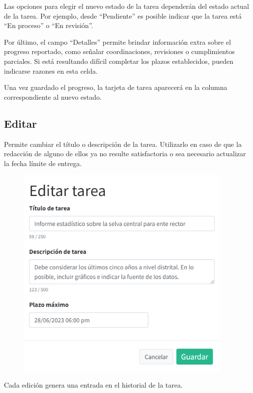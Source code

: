 \documentclass[
  letterpaper,
  DIV=11,
  numbers=noendperiod]{scrreprt}
\begin{document}
Las opciones para elegir el nuevo estado de la tarea dependerán del
estado actual de la tarea. Por ejemplo, desde ``Pendiente'' es posible
indicar que la tarea está ``En proceso'' o ``En revisión''.

Por último, el campo ``Detalles'' permite brindar información extra
sobre el progreso reportado, como señalar coordinaciones, revisiones o
cumplimientos parciales. Si está resultando difícil completar los plazos
establecidos, pueden indicarse razones en esta celda.

Una vez guardado el progreso, la tarjeta de tarea aparecerá en la
columna correspondiente al nuevo estado.

\hypertarget{editar}{%
\subsection{Editar}\label{editar}}

Permite cambiar el título o descripción de la tarea. Utilizarlo en caso
de que la redacción de alguno de ellos ya no resulte satisfactoria o sea
necesario actualizar la fecha límite de entrega.

\begin{figure}

{\centering \includegraphics[width=4.16667in,height=\textheight]{./img/manual-user/task-edit.png}

}

\end{figure}

Cada edición genera una entrada en el historial de la tarea.
\end{document}
